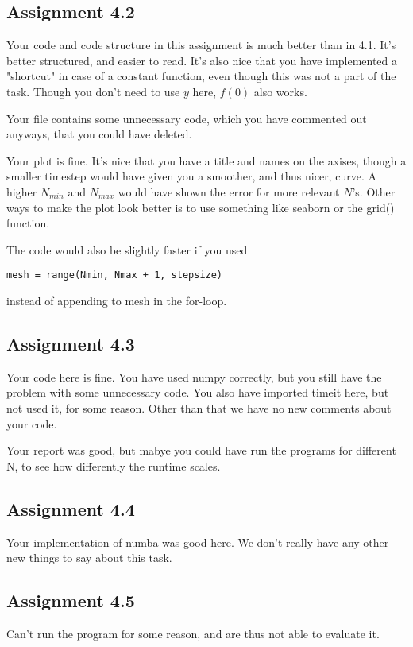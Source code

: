 \documentclass[a4paper]{article}
\begin{document}
\subsection*{Assignment 4.2} \label{sec:assignment5.2}
Your code and code structure in this assignment is much better than in 4.1. It's better structured, and easier to read. It's also nice that you have implemented a "shortcut" in case of a constant function, even though this was not a part of the task. Though you don't need to use $y$ here, $f(0)$ also works. 

Your file contains some unnecessary code, which you have commented out anyways, that you could have deleted.

Your plot is fine. It's nice that you have a title and names on the axises, though a smaller timestep would have given you a smoother, and thus nicer, curve. A higher $N_{min}$ and $N_{max}$ would have shown the error for more relevant $N$'s. Other ways to make the plot look better is to use something like seaborn or the grid() function.

The code would also be slightly faster if you used 
\begin{lstlisting}
mesh = range(Nmin, Nmax + 1, stepsize)
\end{lstlisting}
instead of appending to mesh in the for-loop.


\subsection*{Assignment 4.3}
Your code here is fine. You have used numpy correctly, but you still have the problem with some unnecessary code. You also have imported timeit here, but not used it, for some reason. Other than that we have no new comments about your code.

Your report was good, but mabye you could have run the programs for different N, to see how differently the runtime scales.

\subsection*{Assignment 4.4}
Your implementation of numba was good here. We don't really have any other new things to say about this task.

\subsection*{Assignment 4.5}
Can't run the program for some reason, and are thus not able to evaluate it.
\end{document}

